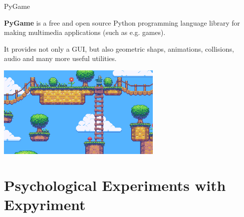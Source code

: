 \begin{frame}[fragile]{PyGame}

    \textbf{PyGame} is a free and open source Python programming language library for making multimedia applications (such as e.g. games).

    \vspace{1em}

    It provides not only a GUI, but also geometric shaps, animations, collisions, audio and many more useful utilities.

    \vspace{1em}

    \centering \includegraphics[width=0.6\textwidth]{13_Expyriment/game.png}


\end{frame}


\section{Psychological Experiments with Expyriment}

\begin{frame}[plain]
    \sectionpage
\end{frame}


